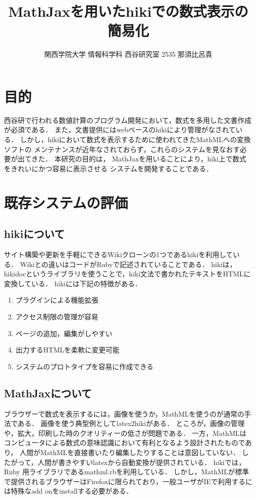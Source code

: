 \documentclass[10pt,a4j,twocolumn]{jsarticle}
\begin{document}
\title{MathJaxを用いたhikiでの数式表示の簡易化}
\author{関西学院大学 情報科学科 西谷研究室 2535 那須比呂貴}
\date{}
\maketitle
\section{目的}
西谷研で行われる数値計算のプログラム開発において，数式を多用した文書作成が必須である．
また，文書提供にはwebベースのhikiにより管理がなされている．
しかし，hikiにおいて数式を表示するために使われてきたMathMLへの変換ソフトの
メンテナンスが近年なされておらず，これらのシステムを見なおす必要が出てきた．
本研究の目的は，
MathJaxを用いることにより，hiki上で数式をきれいにかつ容易に表示させる
システムを開発することである．

\section{既存システムの評価}
\subsection{hikiについて}
サイト構築や更新を手軽にできるWikiクローンの1つであるhikiを利用している．
Wikiとの違いはコードがRubyで記述されていることである．
hikiは，hikidocというライブラリを使うことで，hiki文法で書かれたテキストをHTMLに変換している．
hikiには下記の特徴がある．
\begin{enumerate}
\item プラグインによる機能拡張
\item アクセス制限の管理が容易
\item ページの追加，編集がしやすい
\item 出力するHTMLを柔軟に変更可能
\item システムのプロトタイプを容易に作成できる
\end{enumerate}
\subsection{MathJaxについて}
ブラウザーで数式を表示するには，画像を使うか，MathMLを使うのが通常の手法である．
画像を使う典型例としてlatex2hikiがある．
ところが，画像の管理や，拡大，印刷した時のクオリティーの低さが問題である．
一方，MathMLはコンピュータによる数式の意味認識において有利となるよう設計されたものであり，
人間がMathMLを直接書いたり編集したりすることは意図していない．
したがって，人間が書きやすいlatexから自動変換が提供されている．
hikiでは，Ruby 用ライブラリであるmathml.rbを利用している\cite{hiraku}．
しかし，MathMLが標準で提供されるブラウザーはFirefoxに限られており，一般ユーザがIEで利用するには特殊なadd onをinstallする必要がある．
\end{document}
